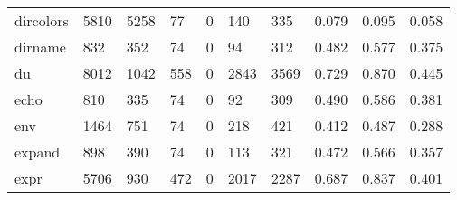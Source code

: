 \begin{longtable}{lp{2.0cm}p{2.0cm}p{2.0cm}p{2.0cm}p{2.0cm}p{2.0cm}p{2.0cm}p{2.0cm}p{2.0cm}}
dircolors &                   5810 &                               5258 &                                77 &                                0 &                               140 &                             335 &                                   0.079 &                                  0.095 &                                0.058 \\
dirname   &                    832 &                                352 &                                74 &                                0 &                                94 &                             312 &                                   0.482 &                                  0.577 &                                0.375 \\
du        &                   8012 &                               1042 &                               558 &                                0 &                              2843 &                            3569 &                                   0.729 &                                  0.870 &                                0.445 \\
echo      &                    810 &                                335 &                                74 &                                0 &                                92 &                             309 &                                   0.490 &                                  0.586 &                                0.381 \\
env       &                   1464 &                                751 &                                74 &                                0 &                               218 &                             421 &                                   0.412 &                                  0.487 &                                0.288 \\
expand    &                    898 &                                390 &                                74 &                                0 &                               113 &                             321 &                                   0.472 &                                  0.566 &                                0.357 \\
expr      &                   5706 &                                930 &                               472 &                                0 &                              2017 &                            2287 &                                   0.687 &                                  0.837 &                                0.401 \\

\end{longtable}

